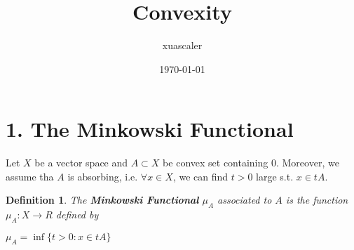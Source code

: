 \documentclass{article}
\title{Convexity}
\author{xuascaler}
\date{\today}
\newtheorem*{definition}{Definition}
\begin{document}
\maketitle

\section*{1. The Minkowski Functional}
Let $X$ be a vector space and $A \subset X$ be convex set containing $0$. Moreover, we assume tha $A$ is absorbing,
i.e. $\forall x \in X$, we can find $t>0$ large s.t. $x \in tA$.

\begin{definition}
    The \textbf{Minkowski Functional} $\mu_{A}$ associated to $A$ is the function $\mu_{A}: X \rightarrow R$ defined by
    \begin{center} $\mu_{A} = \inf\{t > 0: x \in tA\}$ \end{center}
\end{definition}
\end{document}
